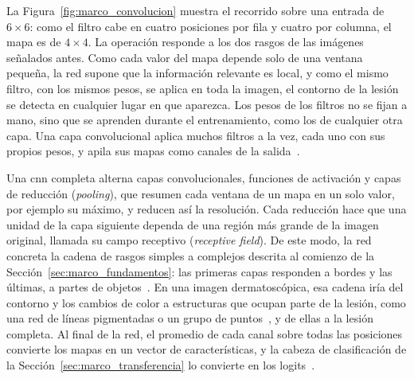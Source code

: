 

La Figura~\ref{fig:marco_convolucion} muestra el recorrido sobre una entrada de $6 \times 6$: como el filtro
cabe en cuatro posiciones por fila y cuatro por columna, el mapa es de $4 \times 4$. La operación responde a los dos rasgos de las imágenes señalados antes. Como cada valor del mapa depende solo de
una ventana pequeña, la red supone que la información relevante es local, y como el mismo filtro, con los mismos
pesos, se aplica en toda la imagen, el contorno de la lesión se detecta en cualquier lugar en que aparezca. Los
pesos de los filtros no se fijan a mano, sino que se aprenden durante el entrenamiento, como los de cualquier
otra capa. Una capa convolucional aplica muchos filtros a la vez, cada uno con sus propios pesos, y apila sus
mapas como canales de la salida~\cite{lecun1998gradient,goodfellow2016deep}.

Una \gls{cnn} completa alterna capas convolucionales, funciones de activación y capas de reducción
(\emph{pooling}), que resumen cada ventana de un mapa en un solo valor, por ejemplo su máximo, y reducen así la
resolución. Cada reducción hace que una unidad de la capa siguiente dependa de una región más grande de la
imagen original, llamada su campo receptivo (\emph{receptive field}). De este modo, la red concreta la cadena
de rasgos simples a complejos descrita al comienzo de la Sección~\ref{sec:marco_fundamentos}: las primeras capas
responden a bordes y las últimas, a partes de objetos~\cite{goodfellow2016deep}. En una imagen dermatoscópica,
esa cadena iría del contorno y los cambios de color a estructuras que ocupan parte de la lesión, como una red de
líneas pigmentadas o un grupo de puntos~\cite{argenziano1998checklist}, y de ellas a la lesión completa. Al
final de la red, el
promedio de cada canal sobre todas las posiciones convierte los mapas en un vector de características, y la
cabeza de clasificación de la Sección~\ref{sec:marco_transferencia} lo convierte en los
logits~\cite{he2015residual}.


